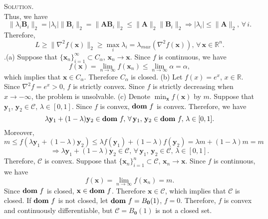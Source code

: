 \documentclass[12pt, a4paper, oneside]{ctexart}
\newenvironment{solution}{\par\noindent\textsc{Solution. }}{\\\par}
\DeclareMathOperator*{\dom}{\bf dom\,}
\begin{document}
\begin{solution}
\[    \]
    Thus, we have
    \[
    \|\lambda_i \mathbf{B}_i\|_2 = |\lambda_i| \|\mathbf{B}_i\|_2 = \|\mathbf{AB}_i\|_2 \leq \|\mathbf{A}\|_2 \|\mathbf{B}_i\|_2 \Rightarrow |\lambda_i| \leq \|\mathbf{A}\|_2,\, \forall\, i.
    \]
    Therefore,
    \[
    L \geq \|\nabla^2 f(\mathbf{x})\|_2 \geq \max\limits_i \lambda_i = \lambda_{max} (\nabla^2 f(\mathbf{x})),\, \forall\, \mathbf{x} \in \mathbb{R}^n.
    \]
    .(a) Suppose that $\{\mathbf{x}_n\}_{i = 1}^\infty \subset C_\alpha$, $\mathbf{x}_n \to \mathbf{x}$. Since $f$ is continuous, we have
    \[
    f(\mathbf{x}) = \lim\limits_{n \to \infty} f(\mathbf{x}_n) \leq \lim\limits_{n \to \infty} \alpha = \alpha,
    \]
    which implies that $\mathbf{x} \in C_\alpha$. Therefore $C_\alpha$ is closed.
    \newline\newline
    (b) Let $f(x) = e^x$, $x \in \mathbb{R}$. Since $\nabla^2 f = e^x > 0$, $f$ is strictly convex. Since $f$ is strictly decreasing when $x \to -\infty$, the problem is unsolvable.
    \newline\newline
    (c) Denote $\min_\mathbf{x} f(\mathbf{x})$ by $m$. \newline
    Suppose that $\mathbf{y}_1$, $\mathbf{y}_2 \in \mathcal{C}$, $\lambda \in [0, 1]$. Since $f$ is convex, $\dom f$ is convex. Therefore, we have
    \[
    \lambda \mathbf{y}_1 + (1 - \lambda) \mathbf{y}_2 \in \dom f,\, \forall\, \mathbf{y}_1,\, \mathbf{y}_2 \in \dom f,\, \lambda \in [0, 1].
    \]
    Moreover, 
    \[
    m \leq f(\lambda \mathbf{y}_1 + (1 - \lambda) \mathbf{y}_2) \leq \lambda f(\mathbf{y}_1) + (1 - \lambda) f(\mathbf{y}_2) = \lambda m + (1 - \lambda) m = m
    \]
    \[
    \Rightarrow \lambda \mathbf{y}_1 + (1 - \lambda) \mathbf{y}_2 \in \mathcal{C},\, \forall\, \mathbf{y}_1,\, \mathbf{y}_2 \in \mathcal{C},\, \lambda \in [0, 1].
    \]
    Therefore, $\mathcal{C}$ is convex. \newline
    Suppose that $\{\mathbf{x}_n\}_{i = 1}^n \subset \mathcal{C}$, $\mathbf{x}_n \to \mathbf{x}$. Since $f$ is continuous, we have
    \[
    f(\mathbf{x}) = \lim\limits_{n \to \infty} f(\mathbf{x}_n) = m.
    \]
    Since $\dom f$ is closed, $\mathbf{x} \in \dom f$. Therefore $\mathbf{x} \in \mathcal{C}$, which implies that $\mathcal{C}$ is closed. \newline
    If $\dom f$ is not closed, let $\dom f = B_\mathbf{0}(1)$, $f = 0$. Therefore, $f$ is convex and continuously differentiable, but $\mathcal{C} = B_\mathbf{0}(1)$ is not a closed set.

\end{solution}
\end{document}
